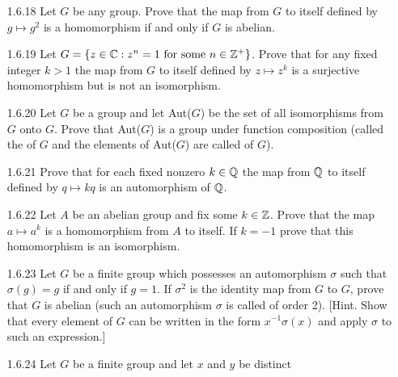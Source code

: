 \begin{enumerate}
   \item[1.6.18]  Let $G$ be any group. Prove that the map from $G$ to itself
                  defined by $g \mapsto g^2$ is a homomorphism if and only if
                  $G$ is abelian.
   \item[1.6.19]  Let $G = \{z \in \mathbb{C} : z^n = 1 \text{ for some }n \in \mathbb{Z}^+\}$.
                  Prove that for any fixed integer $k > 1$ the map from $G$ to
                  itself defined by $z \mapsto z^k$ is a surjective homomorphism
                  but is not an isomorphism.
   \item[1.6.20]  Let $G$ be a group and let Aut($G$) be the set of all
                  isomorphisms from $G$ onto $G$. Prove that Aut($G$) is a
                  group under function composition (called the
                   of $G$ and the elements of Aut($G$)
                  are called  of $G$).
   \item[1.6.21]  Prove that for each fixed nonzero $k \in \mathbb{Q}$ the map from $\mathbb{Q}$
                  to itself defined by $q \mapsto kq$ is an automorphism of
                  $\mathbb{Q}$.
   \item[1.6.22]  Let $A$ be an abelian group and fix some $k \in \mathbb{Z}$. Prove
                  that the map $a \mapsto a^k$ is a homomorphism from $A$ to 
                  itself. If $k = -1$ prove that this homomorphism is an
                  isomorphism.
   \item[1.6.23]  Let $G$ be a finite group which possesses an automorphism
                  $\sigma$ such that $\sigma(g) = g$ if and only if $g = 1$. If
                  $\sigma^2$ is the identity map from $G$ to $G$, prove that $G$
                  is abelian (such an automorphism $\sigma$ is called
                   of order 2). [Hint. Show that every
                  element of $G$ can be written in the form $x^{-1}\sigma(x)$
                  and apply $\sigma$ to such an expression.]
   \item[1.6.24]  Let $G$ be a finite group and let $x$ and $y$ be distinct

\end{enumerate}
